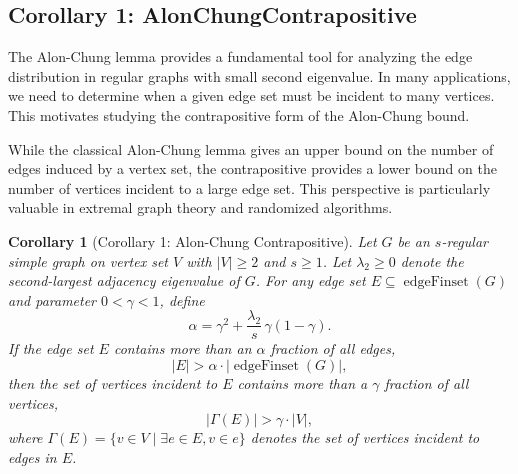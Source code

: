 \documentclass[11pt]{article}
\theoremstyle{plain}
\newtheorem*{corollary}{Corollary}
\theoremstyle{definition}
\theoremstyle{remark}
\begin{document}
\subsection{Corollary 1: AlonChungContrapositive}

The Alon-Chung lemma provides a fundamental tool for analyzing the edge distribution in regular graphs with small second eigenvalue. In many applications, we need to determine when a given edge set must be incident to many vertices. This motivates studying the contrapositive form of the Alon-Chung bound.

While the classical Alon-Chung lemma gives an upper bound on the number of edges induced by a vertex set, the contrapositive provides a lower bound on the number of vertices incident to a large edge set. This perspective is particularly valuable in extremal graph theory and randomized algorithms.

\begin{corollary}[Corollary 1: Alon-Chung Contrapositive]
Let $G$ be an $s$-regular simple graph on vertex set $V$ with $|V| \geq 2$ and $s \geq 1$. Let $\lambda_2 \geq 0$ denote the second-largest adjacency eigenvalue of $G$. For any edge set $E \subseteq \operatorname{edgeFinset}(G)$ and parameter $0 < \gamma < 1$, define
\[
\alpha = \gamma^2 + \frac{\lambda_2}{s}\,\gamma(1-\gamma).
\]
If the edge set $E$ contains more than an $\alpha$ fraction of all edges,
\[
|E| > \alpha \cdot |\operatorname{edgeFinset}(G)|,
\]
then the set of vertices incident to $E$ contains more than a $\gamma$ fraction of all vertices,
\[
|\Gamma(E)| > \gamma \cdot |V|,
\]
where $\Gamma(E) = \{v \in V \mid \exists e \in E, v \in e\}$ denotes the set of vertices incident to edges in $E$.
\end{corollary}
\end{document}
